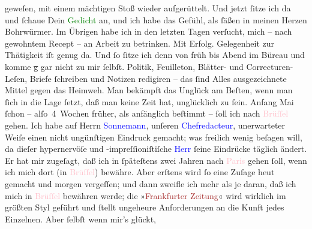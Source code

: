 \documentclass[twoside=false,titlepage=false,open=any, parskip=never, fontsize=12pt, headings=small, chapterprefix=false, appendixprefix=false]{scrbook}
\newcommand{\strikeout}[1]{\sout{#1}}
\newcommand{\pbposition}{\depth}
\newcommand{\pb}{\nobreak\hspace{0pt}\raisebox{-0.1em}{\raisebox{\pbposition}{\textnormal{|}}}\nobreak\hspace{0pt}}
\begin{document}
               geweſen, mit einem mächtigen Stoß wieder aufgerüttelt. Und jetzt ſitze ich da und
               ſchaue Dein \textcolor{green}{Gedicht}{} an, und
               ich habe das Gefühl, als ſäßen in meinen Herzen \label{T_L02661-1v}\label{T_L02661-1h} Bohrwürmer.\pend
           \pstart
           Im Übrigen habe ich in den letzten Tagen verſucht, mich – nach gewohntem Recept – an
               Arbeit zu betrinken. Mit Erfolg. Gelegenheit zur Thätigkeit iſt genug da. Und ſo
               ſitze ich denn von früh bis Abend im Büreau und komme \strikeout{g} gar nicht zu mir ſelbſt. Politik, Feuilleton, Blätter- und
               Correcturen-Leſen, Briefe ſchreiben und Notizen redigiren – {\pb}das ſind Alles ausgezeichnete Mittel gegen das
               Heimweh. Man bekämpft das Unglück am Beſten, wenn man ſich in die Lage ſetzt, daß man
               keine Zeit hat, unglücklich zu ſein. Anfang Mai ſchon –
               alſo 4 Wochen früher, als anfänglich beſtimmt – ſoll ich nach \textcolor{pink}{Brüſſel}{}\ledrightnote{\textcolor{pink}{Brüssel}} gehen. Ich habe auf Herrn \textcolor{blue}{Sonnemann}{}\ledrightnote{\textcolor{blue}{Leopold Sonnemann}}, unſeren \textcolor{blue}{Chefredacteur}{}, unerwarteter Weiſe einen nicht ungünſtigen
               Eindruck gemacht; was freilich wenig beſagen will, da dieſer hypernervöſe und
               -impreſſioniſtiſche \textcolor{blue}{Herr}{}
               ſeine Eindrücke täglich ändert. Er hat mir zugeſagt, daß ich in ſpäteſtens zwei
               Jahren nach \textcolor{pink}{Paris}{}\ledrightnote{\textcolor{pink}{Paris}} gehen ſoll, wenn ich mich dort
               (in \textcolor{pink}{Brüſſel}{}\ledrightnote{\textcolor{pink}{Brüssel}}) bewähre. Aber erſtens wird ſo eine
               Zuſage heut gemacht und morgen vergeſſen; und dann zweifle ich mehr als je daran, daß
               ich mich in \textcolor{pink}{Brüſſel}{}\ledrightnote{\textcolor{pink}{Brüssel}} bewähren {\pb}werde; die »\textcolor{brown}{Frankfurter Zeitung}{}\ledrightnote{\textcolor{brown}{Frankfurter Zeitung}}« wird wirklich im größten Styl geführt und ſtellt
               ungeheure Anforderungen an die Kunft jedes Einzelnen. Aber ſelbſt wenn mir’s glückt,
\end{document}
